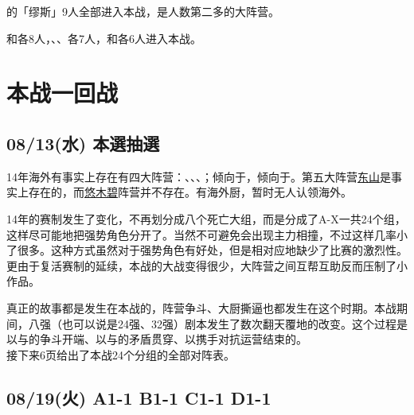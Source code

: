 的「缪斯」9人全部进入本战，是人数第二多的大阵营。

和各8人，、、各7人，和各6人进入本战。

\chapter{本战一回战}

\section{08/13(水) 本選抽選}

14年海外有事实上存在有四大阵营：、、、；倾向于，倾向于。第五大阵营\uline{东山}是事实上存在的，而\uline{悠木碧}阵营并不存在。有海外厨，暂时无人认领海外。

14年的赛制发生了变化，不再划分成八个死亡大组，而是分成了A-X一共24个组，这样尽可能地把强势角色分开了。当然不可避免会出现主力相撞，不过这样几率小了很多。这种方式虽然对于强势角色有好处，但是相对应地缺少了比赛的激烈性。更由于复活赛制的延续，本战的大战变得很少，大阵营之间互帮互助反而压制了小作品。

真正的故事都是发生在本战的，阵营争斗、大厨撕逼也都发生在这个时期。本战期间，八强（也可以说是24强、32强）剧本发生了数次翻天覆地的改变。这个过程是以与的争斗开端、以与的矛盾贯穿、以携手对抗运营结束的。\\

接下来6页给出了本战24个分组的全部对阵表。
\vfill\null
\clearpage

\clearpage

\section{08/19(火) A1-1 B1-1 C1-1 D1-1}


